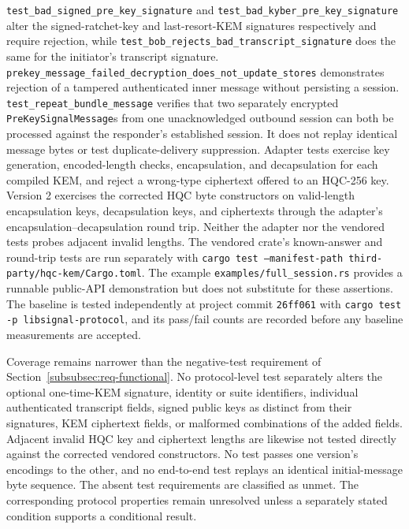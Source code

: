 \texttt{test\_bad\_signed\_pre\_key\_signature} and \texttt{test\_bad\_kyber\_pre\_key\_signature} alter the signed-ratchet-key and last-resort-KEM signatures respectively and require rejection, while \texttt{test\_bob\_rejects\_bad\_\allowbreak transcript\_signature} does the same for the initiator's transcript signature. \texttt{prekey\_message\_failed\_decryption\_\allowbreak does\_not\_update\_stores} demonstrates rejection of a tampered authenticated inner message without persisting a session. \texttt{test\_repeat\_bundle\_message} verifies that two separately encrypted \texttt{PreKeySignalMessage}s from one unacknowledged outbound session can both be processed against the responder's established session. It does not replay identical message bytes or test duplicate-delivery suppression. Adapter tests exercise key generation, encoded-length checks, encapsulation, and decapsulation for each compiled KEM, and reject a wrong-type ciphertext offered to an HQC-256 key. Version 2 exercises the corrected HQC byte constructors on valid-length encapsulation keys, decapsulation keys, and ciphertexts through the adapter's encapsulation--decapsulation round trip. Neither the adapter nor the vendored tests probes adjacent invalid lengths. The vendored crate's known-answer and round-trip tests are run separately with \texttt{cargo test --manifest-path third-party/hqc-kem/Cargo.toml}. The example \texttt{examples/full\_session.rs} provides a runnable public-API demonstration but does not substitute for these assertions. The baseline is tested independently at project commit \texttt{26ff061} with \texttt{cargo test -p libsignal-protocol}, and its pass/fail counts are recorded before any baseline measurements are accepted.

Coverage remains narrower than the negative-test requirement of Section~\ref{subsubsec:req-functional}. No protocol-level test separately alters the optional one-time-KEM signature, identity or suite identifiers, individual authenticated transcript fields, signed public keys as distinct from their signatures, KEM ciphertext fields, or malformed combinations of the added fields. Adjacent invalid HQC key and ciphertext lengths are likewise not tested directly against the corrected vendored constructors. No test passes one version's encodings to the other, and no end-to-end test replays an identical initial-message byte sequence. The absent test requirements are classified as unmet. The corresponding protocol properties remain unresolved unless a separately stated condition supports a conditional result.

